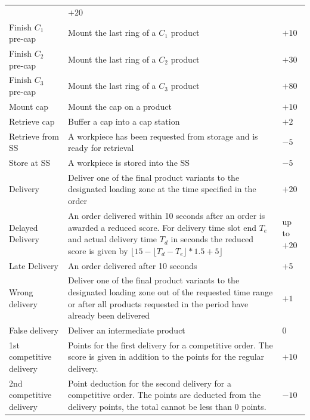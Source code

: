 \documentclass[12pt,twoside]{article}
\begin{document}
{\begin{longtable}{p{}
    |p{}
    |p{}}
        & $+20$
        \\
        Finish $C_1$ pre-cap & Mount the last ring of a $C_1$ product & $+10$
        \\
        Finish $C_2$ pre-cap & Mount the last ring of a $C_2$ product & $+30$
        \\
        Finish $C_3$ pre-cap & Mount the last ring of a $C_3$ product & $+80$
        \\
        Mount cap & Mount the cap on a product & $+10$
        \\
        Retrieve cap & Buffer a cap into a cap station & $+2$
        \\
        Retrieve from \ac{SS}
        & A workpiece has been requested from storage and is ready for retrieval
        & $-5$
        \\
        Store at \ac{SS}
        & A workpiece is stored into the \ac{SS}
        & $-5$
        \\
        Delivery
        & Deliver one of the final product variants to the designated loading
        zone at the time specified in the order
        & $+20$
        \\
        Delayed Delivery & An order delivered within 10 seconds after an order
        is awarded a reduced score. For delivery time slot end $T_e$ and actual
        delivery time $T_d$ in seconds the reduced score is given by \newline
        $\lfloor 15 - \lfloor T_d - T_e \rfloor * 1.5 + 5 \rfloor$
        & up to $+20$
        \\
        Late Delivery & An order delivered after 10 seconds & +5 \\
        Wrong delivery & Deliver one of the final product variants to
        the designated loading zone out of the requested time range or
        after all products requested in the period have already been
        delivered
        & $+1$
        \\
        False delivery & Deliver an intermediate product & $0$
        \\
        1st competitive delivery
        & Points for the first delivery for a competitive order. The score is
        given in addition to the points for the regular delivery.
        &$+ 10$
        \\
        2nd competitive delivery
        & Point deduction for the second delivery for a competitive order. The
        points are deducted from the delivery points, the total cannot be less
        than 0 points.
        &$- 10$

\end{longtable}}
\end{document}
